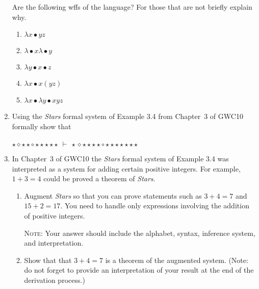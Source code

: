 \documentclass{article}
\begin{document}
\begin{enumerate}
Are the following wffs of the language? For those that are not briefly explain why.
 \begin{enumerate}
 \item $\lambda x \bullet yz$
 \item $\lambda \bullet x \lambda \bullet y$
 \item $\lambda y \bullet x \bullet z$
 \item $\lambda x \bullet x(yz)$
 \item $\lambda x \bullet \lambda y \bullet xyz$
 \end{enumerate}

 \item
Using the {\em Stars} formal system of Example 3.4 from Chapter~3 of GWC10 formally show that\\
 \\
 ${\star}{\diamond}{\star}{\star}{\circ}{\star}{\star}{\star}{\star}{\star}\ {\vdash}\ {\star}{\diamond}{\star}{\star}{\star}{\star}{\circ}{\star}{\star}{\star}{\star}{\star}{\star}{\star}$

 \item
 In Chapter~3 of GWC10 the {\em Stars} formal system of Example 3.4 was interpreted as a system for adding certain positive integers. For example, $1 + 3 = 4$ could be proved a theorem of {\em Stars}.

 \begin{enumerate}
 \item Augment {\em Stars} so that you can prove statements such as $3+4=7$ and $15 + 2 = 17$.
 You need to handle only expressions involving the addition of positive integers.

 \textsc{Note:} Your answer should include the alphabet, syntax, inference system, and interpretation.
 \item Show that that $3 + 4 = 7$ is a theorem of the augmented system. (Note: do not forget to provide an interpretation of your result at the end of the derivation process.)
 \end{enumerate}

\end{enumerate}
\end{document}
